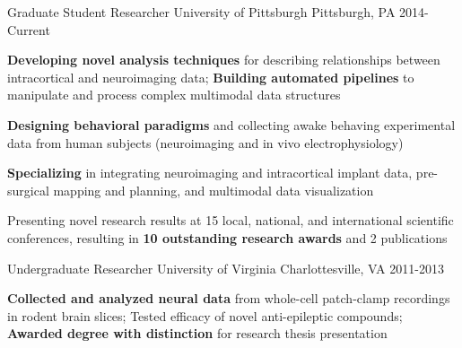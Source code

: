 \vspace*{-0.25cm}

\vspace*{0.3cm}

\begin{cventries}

\cventry
    {Graduate Student Researcher} %
    {University of Pittsburgh} %
    {Pittsburgh, PA} %
    {2014-Current} %
    {
      \begin{cvitems} %
        \item {\textbf{Developing novel analysis techniques} for describing relationships between intracortical and neuroimaging data; \textbf{Building automated pipelines} to manipulate and process complex multimodal data structures}
        \item {\textbf{Designing behavioral paradigms} and collecting awake behaving experimental data from human subjects (neuroimaging and in vivo electrophysiology)}
		\item {\textbf{Specializing} in integrating neuroimaging and intracortical implant data, pre-surgical mapping and planning, and multimodal data visualization}        
        \item {Presenting novel research results at 15 local, national, and international scientific conferences, resulting in \textbf{10 outstanding research awards} and 2 publications}
      \end{cvitems}
    }
    \vspace*{0.2cm}
    
\cventry
    {Undergraduate Researcher}%
    {University of Virginia}
    {Charlottesville, VA} %
    {2011-2013} %
    {
      \begin{cvitems}
      	\item {\textbf{Collected and analyzed neural data} from whole-cell patch-clamp recordings in rodent brain slices; Tested efficacy of novel anti-epileptic compounds; \textbf{Awarded degree with distinction} for research thesis presentation}
      \end{cvitems}
    }
    \vspace*{0.2cm}


\end{cventries}
